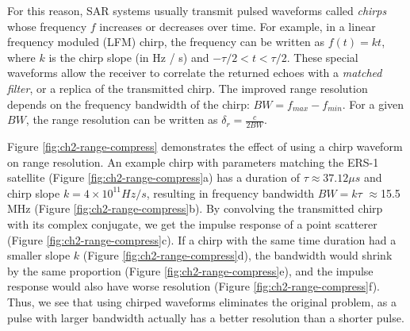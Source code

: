 For this reason, SAR systems usually transmit pulsed waveforms called \emph{chirps} whose frequency $f$ increases or decreases over time. For example, in a linear frequency moduled (LFM) chirp, the frequency can be written as $ f(t) = k t$, where $k$ is the chirp slope (in Hz / s) and $-\tau / 2 < t < \tau/2$.
These special waveforms allow the receiver to correlate the returned echoes with a \emph{matched filter}, or a replica of the transmitted chirp. The improved range resolution depends on the frequency bandwidth of the chirp: $BW = f_{max} - f_{min}$.
For a given $BW$, the range resolution can be written as $\delta_r = \frac{c}{2 BW}$. 


Figure \ref{fig:ch2-range-compress} demonstrates the effect of using a chirp waveform on range resolution. An example chirp with parameters matching the ERS-1 satellite (Figure \ref{fig:ch2-range-compress}a)
has a duration of $\tau \approx 37.12 \mu s$ and chirp slope $k = 4 \times 10^{11} Hz / s$, resulting in frequency bandwidth $BW = k \tau$ $\approx$15.5 MHz (Figure \ref{fig:ch2-range-compress}b). By convolving the transmitted chirp with its complex conjugate, we get the impulse response of a point scatterer (Figure \ref{fig:ch2-range-compress}c). If a chirp with the same time duration had a smaller slope $k$ (Figure \ref{fig:ch2-range-compress}d), the bandwidth would shrink by the same proportion (Figure \ref{fig:ch2-range-compress}e), and the impulse response would also have worse resolution (Figure \ref{fig:ch2-range-compress}f).
Thus, we see that using chirped waveforms eliminates the original problem, as a pulse with larger bandwidth actually has a better resolution than a shorter pulse.


